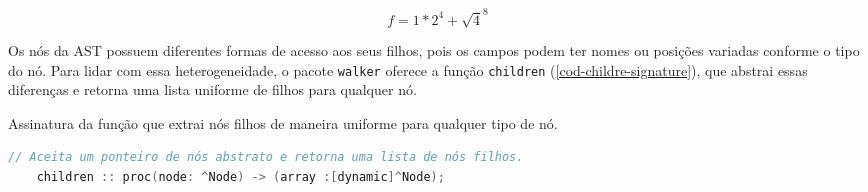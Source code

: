 \begin{equation} \label{eq-svg}
   f =  1*2 ^ 4 + \sqrt 4^8
\end{equation}

Os nós da AST possuem diferentes formas de acesso aos seus filhos, pois os campos podem ter nomes ou posições variadas conforme o tipo do nó. Para lidar com essa heterogeneidade, o pacote \texttt{walker} oferece a função \texttt{children} (\autoref{cod-childre-signature}), que abstrai essas diferenças e retorna uma lista uniforme de filhos para qualquer nó.

\begin{codigo}[H]
        \caption{\small Assinatura da função que extrai nós filhos de maneira uniforme para qualquer tipo de nó.}
        \label{cod-childre-signature}
  \begin{lstlisting}[language = C]
    // Aceita um ponteiro de nós abstrato e retorna uma lista de nós filhos.
    children :: proc(node: ^Node) -> (array :[dynamic]^Node);
  \end{lstlisting}
\end{codigo}

